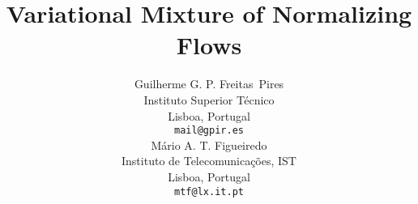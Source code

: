 \documentclass{article}
\title{Variational Mixture of Normalizing Flows}
\author{%
  Guilherme G. P. Freitas~Pires\\
  Instituto Superior Técnico\\
  Lisboa, Portugal\\
  \texttt{mail@gpir.es}\\
  \And
  Mário A. T. Figueiredo\\
  Instituto de Telecomunicações, IST\\
  Lisboa, Portugal\\
  \texttt{mtf@lx.it.pt}\\
}
\begin{document}
\maketitle

\begin{abstract}

\end{abstract}







\printbibliography
\end{document}
